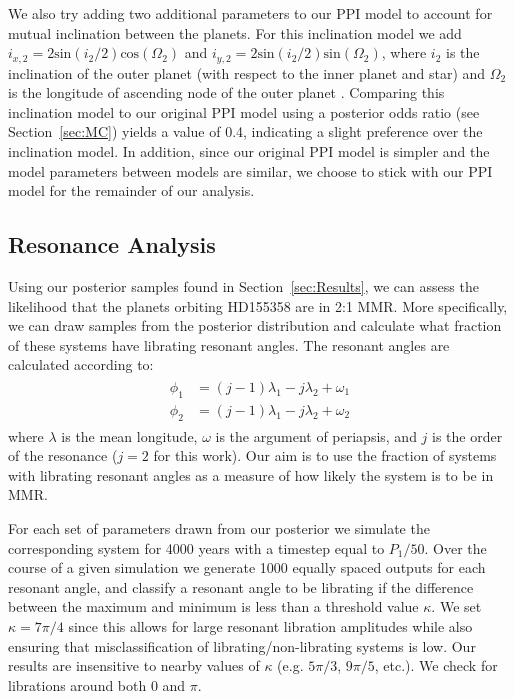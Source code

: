 We also try adding two additional parameters to our PPI model to account for mutual inclination between the planets.
For this inclination model we add $i_{x,2} = 2\textrm{sin}(i_2/2)\textrm{cos}(\Omega_2)$ and $i_{y,2} = 2\textrm{sin}(i_2/2)\textrm{sin}(\Omega_2)$, where $i_2$ is the inclination of the outer planet (with respect to the inner planet and star) and $\Omega_2$ is the longitude of ascending node of the outer planet \citep{Pal2009}. 
Comparing this inclination model to our original PPI model using a posterior odds ratio (see Section~\ref{sec:MC}) yields a value of 0.4, indicating a slight preference over the inclination model.
In addition, since our original PPI model is simpler and the model parameters between models are similar, we choose to stick with our PPI model for the remainder of our analysis. 


\subsection{Resonance Analysis}
Using our posterior samples found in Section~\ref{sec:Results}, we can assess the likelihood that the planets orbiting HD155358 are in 2:1 MMR. 
More specifically, we can draw samples from the posterior distribution and calculate what fraction of these systems have librating resonant angles. 
The resonant angles are calculated according to:
\begin{align*}
\begin{split}
\phi_1 &= (j - 1)\lambda_1 - j\lambda_2 + \omega_1 \\
\phi_2 &= (j - 1)\lambda_1 - j\lambda_2 + \omega_2 
\end{split}
\end{align*}
where $\lambda$ is the mean longitude, $\omega$ is the argument of periapsis, and $j$ is the order of the resonance ($j=2$ for this work).
Our aim is to use the fraction of systems with librating resonant angles as a measure of how likely the system is to be in MMR. 

For each set of parameters drawn from our posterior we simulate the corresponding system for 4000 years with a timestep equal to $P_1/50$. 
Over the course of a given simulation we generate 1000 equally spaced outputs for each resonant angle, and classify a resonant angle to be librating if the difference between the maximum and minimum is less than a threshold value $\kappa$. 
We set $\kappa = 7\pi/4$ since this allows for large resonant libration amplitudes while also ensuring that misclassification of librating/non-librating systems is low. 
Our results are insensitive to nearby values of $\kappa$ (e.g. $5\pi/3$, $9\pi/5$, etc.).
We check for librations around both 0 and $\pi$.

